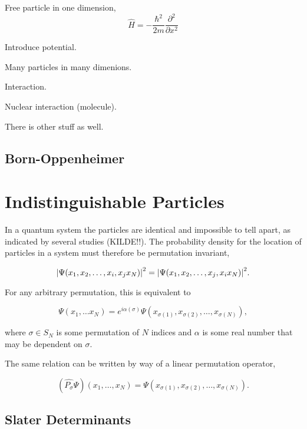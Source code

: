     Free particle in one dimension,
    \begin{equation}
        \hat{H} = -\frac{\hbar^2}{2m} \frac{\partial^2}{\partial x^2}
    \end{equation}

    Introduce potential.

    Many particles in many dimenions.

    Interaction.

    Nuclear interaction (molecule).

    There is other stuff as well.

    \subsection{Born-Oppenheimer}


\section{Indistinguishable Particles}

    In a quantum system the particles are identical and impossible to tell
    apart, as indicated by several studies (KILDE!!). The probability density
    for the location of particles in a system must therefore be permutation
    invariant,

    \begin{equation}
        \abs{\Psi(x_1, x_2, \dots, x_i, x_j x_N)}^2 
        = 
        \abs{\Psi(x_1, x_2, \dots, x_j, x_i x_N)}^2.
    \end{equation}

    For any arbitrary permutation, this is equivalent to 
    
    \begin{equation}
        \Psi(x_1, \dots x_N) 
        =
        e^{i\alpha(\sigma)}\Psi(x_{\sigma(1)}, x_{\sigma(2)}, \dots, x_{\sigma(N)}),
    \end{equation}

    where $\sigma \in S_N$ is some permutation of $N$ indices and $\alpha$ is 
    some real number that may be dependent on $\sigma$.

    The same relation can be written by way of a linear permutation operator,

    \begin{equation}
        (\hat{P_\sigma}\Psi)(x_1, \dots, x_N)
        =
        \Psi(x_{\sigma(1)}, x_{\sigma(2)}, \dots, x_{\sigma(N)}).
    \end{equation}
    
    \subsection{Slater Determinants}